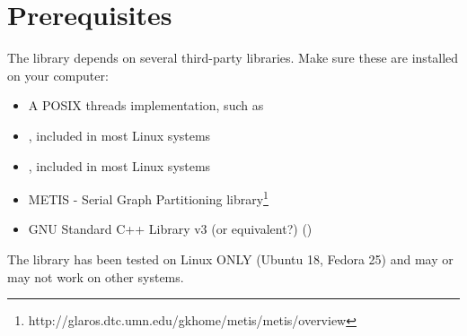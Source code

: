 \section{Prerequisites}
\label{2. Prerequisites}

The  library depends on several third-party libraries. Make sure
these are installed on your computer:
\begin{itemize}
    \item A POSIX threads implementation, such as 
    \item {}, included in most Linux systems
    \item {}, included in most Linux systems
    \item METIS - Serial Graph Partitioning library\footnote{http://glaros.dtc.umn.edu/gkhome/metis/metis/overview}
    \item GNU Standard C++ Library v3 (or equivalent?) ()
\end{itemize}

The library has been tested on Linux ONLY (Ubuntu 18, Fedora 25) and may or
may not work on other systems.

